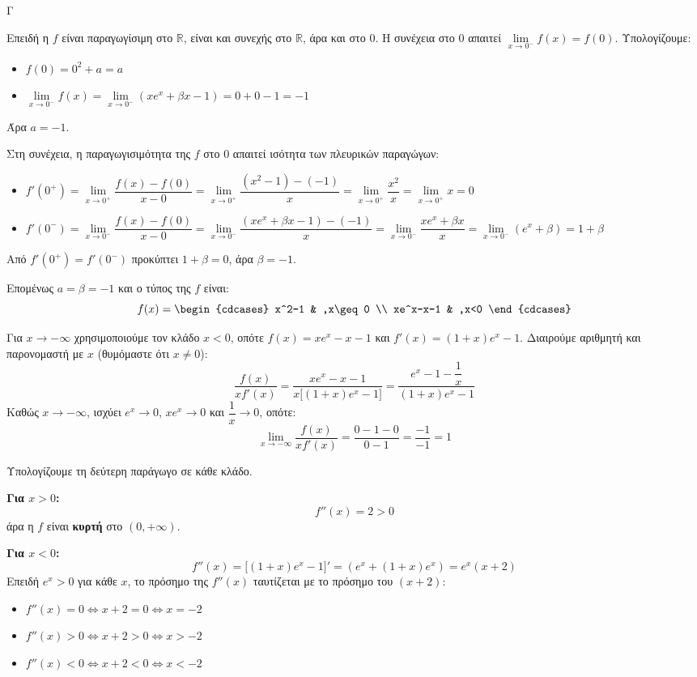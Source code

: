 \begin{thema}{Γ}
\begin{erwthma}
\item Επειδή η $f$ είναι παραγωγίσιμη στο $\mathbb{R}$, είναι και συνεχής στο $\mathbb{R}$, άρα και στο $0$. Η συνέχεια στο $0$ απαιτεί $\lim\limits_{x\to 0^-}f(x)=f(0)$. Υπολογίζουμε:
\begin{itemize}
\item $f(0)=0^2+a=a$
\item $\lim\limits_{x\to 0^-}f(x)=\lim\limits_{x\to 0^-}(xe^x+\beta x-1)=0+0-1=-1$
\end{itemize}
Άρα $a=-1$.

Στη συνέχεια, η παραγωγισιμότητα της $f$ στο $0$ απαιτεί ισότητα των πλευρικών παραγώγων:
\begin{itemize}
\item $f'(0^+)=\lim\limits_{x\to 0^+}\dfrac{f(x)-f(0)}{x-0}=\lim\limits_{x\to 0^+}\dfrac{(x^2-1)-(-1)}{x}=\lim\limits_{x\to 0^+}\dfrac{x^2}{x}=\lim\limits_{x\to 0^+}x=0$
\item $f'(0^-)=\lim\limits_{x\to 0^-}\dfrac{f(x)-f(0)}{x-0}=\lim\limits_{x\to 0^-}\dfrac{(xe^x+\beta x-1)-(-1)}{x}=\lim\limits_{x\to 0^-}\dfrac{xe^x+\beta x}{x}=\lim\limits_{x\to 0^-}(e^x+\beta)=1+\beta$
\end{itemize}
Από $f'(0^+)=f'(0^-)$ προκύπτει $1+\beta=0$, άρα $\beta=-1$.

Επομένως $a=\beta=-1$ και ο τύπος της $f$ είναι:
\[ f(x)=\begin{cdcases} x^2-1 & ,x\geq0 \\ xe^x-x-1 & ,x<0 \end{cdcases} \]

\item Για $x\to-\infty$ χρησιμοποιούμε τον κλάδο $x<0$, οπότε $f(x)=xe^x-x-1$ και $f'(x)=(1+x)e^x-1$. Διαιρούμε αριθμητή και παρονομαστή με $x$ (θυμόμαστε ότι $x\ne 0$):
\[
\frac{f(x)}{xf'(x)}=\frac{xe^x-x-1}{x\bigl[(1+x)e^x-1\bigr]}=\frac{e^x-1-\dfrac{1}{x}}{(1+x)e^x-1}
\]
Καθώς $x\to-\infty$, ισχύει $e^x\to 0$, $xe^x\to 0$ και $\dfrac{1}{x}\to 0$, οπότε:
\[
\lim_{x\to-\infty}\frac{f(x)}{xf'(x)}=\frac{0-1-0}{0-1}=\frac{-1}{-1}=1
\]

\item Υπολογίζουμε τη δεύτερη παράγωγο σε κάθε κλάδο.

\textbf{Για $x>0$:}
\[f''(x)=2>0\]
άρα η $f$ είναι \textbf{κυρτή} στο $(0,+\infty)$.

\textbf{Για $x<0$:}
\[f''(x)=\bigl[(1+x)e^x-1\bigr]'=(e^x+(1+x)e^x)=e^x(x+2)\]
Επειδή $e^x>0$ για κάθε $x$, το πρόσημο της $f''(x)$ ταυτίζεται με το πρόσημο του $(x+2)$:
\begin{itemize}
\item $f''(x)=0\Leftrightarrow x+2=0\Leftrightarrow x=-2$
\item $f''(x)>0\Leftrightarrow x+2>0\Leftrightarrow x>-2$
\item $f''(x)<0\Leftrightarrow x+2<0\Leftrightarrow x<-2$
\end{itemize}


\end{erwthma}
\end{thema}
